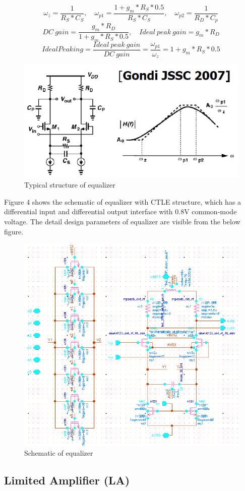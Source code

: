 \documentclass[11pt,a4paper]{article}
\begin{document}
\begin{spacing}{1.25}
$$\omega_z = \frac{1}{R_S * C_S},\quad \omega_{p1} = \frac{1 + g_m * R_S * 0.5}{R_S * C_S}, \quad \omega_{p2} = \frac{1}{R_D * C_p}$$
$$DC \ gain = \frac{g_m * R_D}{1 + g_m * R_S * 0.5}, \quad Ideal\ peak\ gain = g_m * R_D$$
$$Ideal Peaking = \frac{Ideal\ peak\ gain}{DC\ gain} = \frac{\omega_{p1}}{\omega_z} = 1 + g_m * R_S * 0.5$$
 
\begin{figure}[H]
    \centerline{\includegraphics[width=0.6\linewidth]{./Img/typical_equalizer.png}}
    \caption{Typical structure of equalizer}
\end{figure}
Figure 4 shows the schematic of equalizer with CTLE structure, which has a differential input and differential output interface with 0.8V common-mode voltage. The detail design parameters of equalizer are visible from the below figure. 
\begin{figure}[H]
    \centerline{\includegraphics[width=0.7\linewidth]{./Img/Schematic_Equalizer_Background.png}}
    \caption{Schematic of equalizer}
\end{figure}

\subsection{Limited Amplifier (LA)}


\end{spacing}
\end{document}
